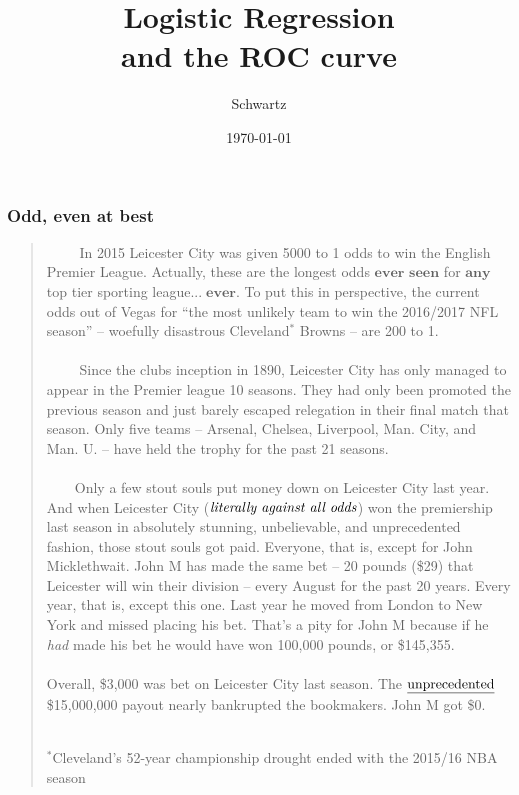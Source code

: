 \documentclass[xcolor={dvipsnames}]{beamer}
\title{Logistic Regression\\ and the ROC curve}
\author{Schwartz}
\date{\today}
\begin{document}
\frame{\titlepage}

{
\beamertemplatenavigationsymbolsempty

\frame
{
 \frametitle{Odd, even at best}

{
\selectfont
\begin{quote}
\scriptsize
\justify
$\quad\quad$ In 2015 Leicester City was given  5000 to 1 odds to win the
English Premier League. Actually, these are the longest odds $\textrm{$\textbf{ever seen}$}$ for $\textrm{$\textbf{any}$}$ top tier sporting league...$\textrm{$\;\textbf{ever}$}$.  To put this in perspective, the current odds out of Vegas for ``the most unlikely team to win the 2016/2017 NFL season'' -- woefully disastrous Cleveland$^*$ Browns -- are 200 to 1. \\${}$\\

$\quad\quad$ Since the clubs inception in 1890, Leicester City has only managed to appear in the Premier league 10 seasons.  They had only been promoted the previous season and just barely escaped relegation in their final match that season. Only five teams -- Arsenal, Chelsea, Liverpool, Man. City, and Man. U. -- have held the trophy for the past 21 seasons.  \\${}$\\

$\quad\quad$Only a few stout souls put money down on Leicester City last year. %
And when Leicester City ($\textrm{\emph{literally against all odds}}$) won the premiership last season in absolutely stunning, unbelievable, and unprecedented fashion, those stout souls got paid. 
Everyone, that is, except for John Micklethwait.  John M has made the same bet -- 20 pounds (\$29) that Leicester will win their division -- every August for the past 20 years. Every year, that is, except this one. Last year he moved from London to New York and missed placing his bet. That's a pity for John M because if he \emph{had} made his bet he would have won 100,000 pounds, or \$145,355. \\${}$\\

Overall, \$3,000 was bet on Leicester City last season. The $\textrm{\underline{unprecedented}}$ \$15,000,000 payout nearly bankrupted the bookmakers.  John M got \$0.\\${}$

\tiny 
$^*$Cleveland's 52-year championship drought  ended with the 2015/16 NBA season
\end{quote}
}
}
}
\end{document}
